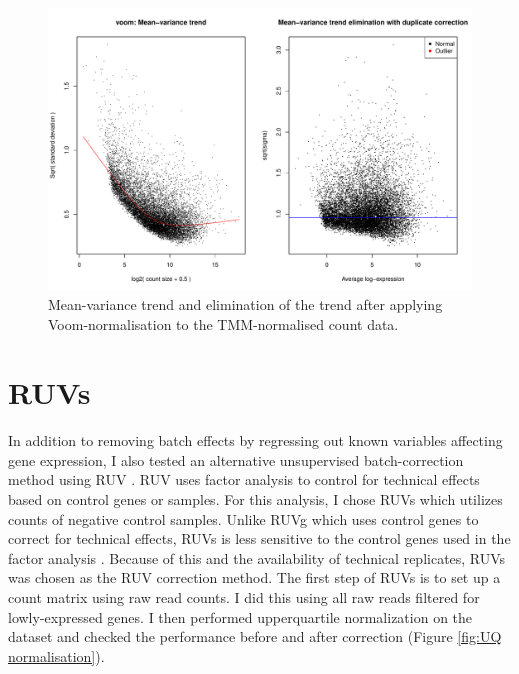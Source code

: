 \documentclass[12pt,a4paper,titlepage,twoside,openright]{book}
\begin{document}
\begin{mainmatter}
{\begin{figure}[htb!]
\centering
\includegraphics[width=\textwidth,height=\textheight,keepaspectratio]{Figures/Limma_voomDuplicateCorrelation_TMMNormalisation.pdf}
\caption{Mean-variance trend and elimination of the trend after applying Voom-normalisation to the TMM-normalised count data.}
\label{fig:Voom normalisation}
\end{figure}

\section{RUVs}
In addition to removing batch effects by regressing out known variables affecting gene expression, I also tested an alternative unsupervised batch-correction method using RUV \cite{gagnon2012using, risso2014normalization}. RUV uses factor analysis to control for technical effects based on control genes or samples. For this analysis, I chose RUVs which utilizes counts of negative control samples. Unlike RUVg which uses control genes to correct for technical effects, RUVs is less sensitive to the control genes used in the factor analysis \cite{risso2014normalization}. Because of this and the availability of technical replicates, RUVs was chosen as the RUV correction method. 
The first step of RUVs is to set up a count matrix using raw read counts. I did this using all raw reads filtered for lowly-expressed genes. I then performed upperquartile normalization on the dataset and checked the performance before and after correction (﻿Figure \ref{fig:UQ normalisation}﻿). 

}
\end{mainmatter}
\end{document}

